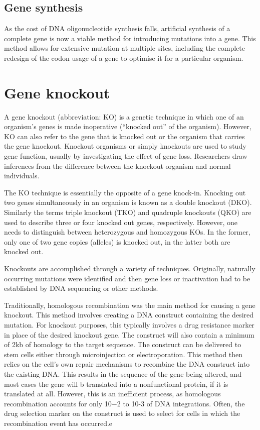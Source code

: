 \hypertarget{gene-synthesis}{%
\subsection{Gene synthesis}\label{gene-synthesis}}

As the cost of DNA oligonucleotide synthesis falls, artificial synthesis of a complete gene is now a viable method for introducing mutations into a gene. This method allows for extensive mutation at multiple sites, including the complete redesign of the codon usage of a gene to optimise it for a particular organism.

\hypertarget{gene-knockout}{%
\section{Gene knockout}\label{gene-knockout}}

A gene knockout (abbreviation: KO) is a genetic technique in which one of an organism's genes is made inoperative (``knocked out'' of the organism). However, KO can also refer to the gene that is knocked out or the organism that carries the gene knockout. Knockout organisms or simply knockouts are used to study gene function, usually by investigating the effect of gene loss. Researchers draw inferences from the difference between the knockout organism and normal individuals.

The KO technique is essentially the opposite of a gene knock-in. Knocking out two genes simultaneously in an organism is known as a double knockout (DKO). Similarly the terms triple knockout (TKO) and quadruple knockouts (QKO) are used to describe three or four knocked out genes, respectively. However, one needs to distinguish between heterozygous and homozygous KOs. In the former, only one of two gene copies (alleles) is knocked out, in the latter both are knocked out.

Knockouts are accomplished through a variety of techniques. Originally, naturally occurring mutations were identified and then gene loss or inactivation had to be established by DNA sequencing or other methods.

Traditionally, homologous recombination was the main method for causing a gene knockout. This method involves creating a DNA construct containing the desired mutation. For knockout purposes, this typically involves a drug resistance marker in place of the desired knockout gene. The construct will also contain a minimum of 2kb of homology to the target sequence. The construct can be delivered to stem cells either through microinjection or electroporation. This method then relies on the cell's own repair mechanisms to recombine the DNA construct into the existing DNA. This results in the sequence of the gene being altered, and most cases the gene will b translated into a nonfunctional protein, if it is translated at all. However, this is an inefficient process, as homologous recombination accounts for only 10−2 to 10-3 of DNA integrations. Often, the drug selection marker on the construct is used to select for cells in which the recombination event has occurred.e

